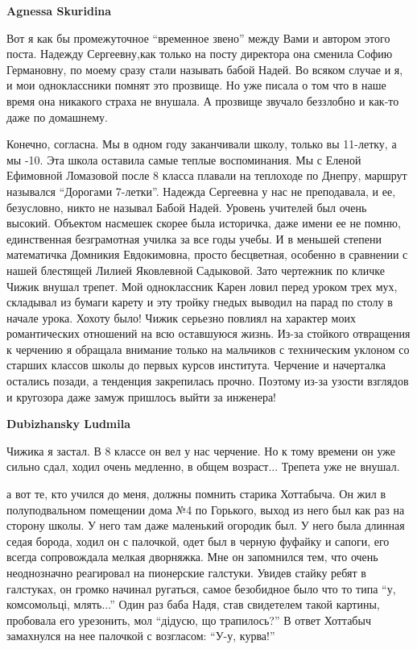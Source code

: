 \begin{itemize}
\begin{itemize}
\begin{itemize}
\end{itemize} %

\textbf{Agnessa Skuridina} 

Вот я как бы промежуточное \enquote{временное звено} между Вами и автором этого поста.
Надежду Сергеевну,как только на посту директора она сменила Софию Германовну,
по моему сразу стали называть бабой Надей. Во всяком случае и я, и мои
одноклассники помнят это прозвище. Но уже писала о том что в наше время она
никакого страха не внушала. А прозвище звучало беззлобно и как-то даже по
домашнему.


Конечно, согласна. Мы в одном году заканчивали школу, только вы 11-летку, а мы
-10. Эта школа оставила самые теплые воспоминания. Мы с Еленой Ефимовной
Ломазовой после 8 класса плавали на теплоходе по Днепру, маршрут назывался
\enquote{Дорогами 7-летки}. Надежда Сергеевна у нас не преподавала, и ее, безусловно,
никто не называл Бабой Надей. Уровень учителей был очень высокий. Объектом
насмешек скорее была историчка, даже имени ее не помню, единственная
безграмотная училка за все годы учебы. И в меньшей степени математичка Домникия
Евдокимовна, просто бесцветная, особенно в сравнении с нашей блестящей Лилией
Яковлевной Садыковой. Зато чертежник по кличке Чижик внушал трепет. Мой
одноклассник Карен ловил перед уроком трех мух, складывал из бумаги карету и
эту тройку гнедых выводил на парад по столу в начале урока. Хохоту было! Чижик
серьезно повлиял на характер моих романтических отношений на всю оставшуюся
жизнь. Из-за стойкого отвращения к черчению я обращала внимание только на
мальчиков с техническим уклоном со старших классов школы до первых курсов
института. Черчение и начерталка остались позади, а тенденция закрепилась
прочно. Поэтому из-за узости взглядов и кругозора даже замуж пришлось выйти за
инженера!

\begin{itemize} %
\textbf{Dubizhansky Ludmila} 

Чижика я застал. В 8 классе он вел у нас черчение. Но к тому времени он уже
сильно сдал, ходил очень медленно, в общем возраст... Трепета уже не внушал.


а вот те, кто учился до меня, должны помнить старика Хоттабыча. Он жил в
полуподвальном помещении дома №4 по Горького, выход из него был как раз на
сторону школы. У него там даже маленький огородик был. У него была длинная
седая борода, ходил он с палочкой, одет был в черную фуфайку и сапоги, его
всегда сопровождала мелкая дворняжка. Мне он запомнился тем, что очень
неоднозначно реагировал на пионерские галстуки. Увидев стайку ребят в
галстуках, он громко начинал ругаться, самое безобидное было что то типа \enquote{у,
комсомольці, млять...} Один раз баба Надя, став свидетелем такой картины,
пробовала его урезонить, мол \enquote{дідусю, що трапилось?} В ответ Хоттабыч
замахнулся на нее палочкой с возгласом: \enquote{У-у, курва!}


\end{itemize}
\end{itemize}
\end{itemize}
